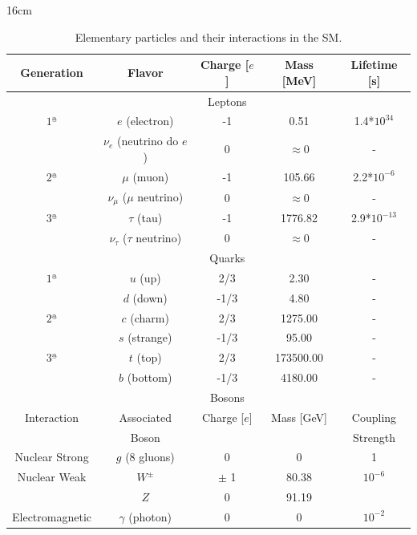 \begin{table}[htbp]{16cm}
\caption{Elementary particles and their interactions in the SM.}
\centering
\begin{tabular}{ccccc}
\hline \hline
Generation & Flavor 							& Charge [$e$]  & Mass [MeV] 	& Lifetime [s]\\
\hline
		   &		 							& Leptons 	    &	   		   	& \\
\hline
$1ª$    & $e$ (electron) 					& -1  			& 0.51    		& 1.4*$10^{34}$ \\
		& $\nu_e$ (neutrino do $e$) 		& 0 			& $\approx 0$ 	& - \\
$2ª$	& $\mu$ (muon)  					& -1  			& 105.66  		& 2.2*$10^{-6}$ \\
		& $\nu_{\mu}$ ($\mu$ neutrino) 	    & 0 			& $\approx 0$ 	& - \\
$3ª$	& $\tau$ (tau) 						& -1  			& 1776.82 		& 2.9*$10^{-13}$ \\
		& $\nu_{\tau}$ ($\tau$ neutrino)    & 0 			& $\approx 0$ 	& - \\
\hline
		&		        & Quarks  	 &	   		   & \\
\hline
$1ª$	& $u$ (up)      & 2/3   & 2.30  	& - \\
		& $d$ (down)    & -1/3  & 4.80  	& - \\
$2ª$	& $c$ (charm)   & 2/3	& 1275.00 	& - \\
		& $s$ (strange) & -1/3  & 95.00   	& - \\
$3ª$	& $t$ (top)		& 2/3	& 173500.00 & - \\
		& $b$ (bottom)  & -1/3  & 4180.00 	& - \\
\hline
		        &		 		   & Bosons  	&	   		 & \\
\hline
Interaction 	& Associated   & Charge [$e$] & Mass [GeV] & Coupling\\
				& Boson		   &			&			   & Strength\\
\hline
Nuclear Strong  & $g$ (8 gluons)   & 0       	& 0     	 & 1\\
Nuclear Weak    & $W^{\pm}$		   & $\pm$ 1 	& 80.38 	 & $10^{-6}$\\
				& $Z$  		   	   & 0		 	& 91.19 	 &\\
Electromagnetic & $\gamma$ (photon) & 0 		 	& 0     	 & $10^{-2}$\\
\hline \hline
\end{tabular}
\label{tab:TabParticulas}
\end{table}

